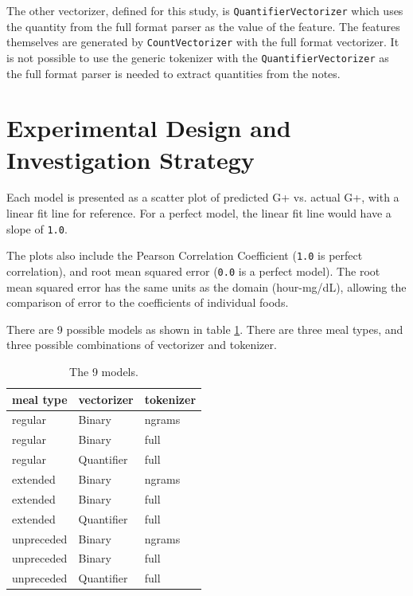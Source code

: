 \documentclass[conference]{IEEEtran}
\begin{document}
The other vectorizer, defined for this study, is \texttt{QuantifierVectorizer} which uses the quantity from the full format parser as the value of the feature. The features themselves are generated by \texttt{CountVectorizer} with the full format vectorizer. It is not possible to use the generic tokenizer with the \texttt{QuantifierVectorizer} as the full format parser is needed to extract quantities from the notes.

\section{Experimental Design and Investigation Strategy}

Each model is presented as a scatter plot of predicted G+ vs. actual G+, with a linear fit line for reference. For a perfect model, the linear fit line would have a slope of \texttt{1.0}.

The plots also include the Pearson Correlation Coefficient (\texttt{1.0} is perfect correlation), and root mean squared error (\texttt{0.0} is a perfect model). The root mean squared error has the same units as the domain (hour-mg/dL), allowing the comparison of error to the coefficients of individual foods.

There are 9 possible models as shown in table \ref{table:models}. There are three meal types, and three possible combinations of vectorizer and tokenizer.

\begin{table}
\centering
\begin{tabular}[tbp]{|l l l|}
    \hline
    meal type   & vectorizer & tokenizer \\
    \hline
    regular     & Binary     & ngrams \\
    regular     & Binary     & full \\
    regular     & Quantifier & full \\
    extended    & Binary     & ngrams \\
    extended    & Binary     & full \\
    extended    & Quantifier & full \\
    unpreceded & Binary     & ngrams \\
    unpreceded & Binary     & full \\
    unpreceded & Quantifier & full \\
    \hline
\end{tabular}
\caption{The 9 models. \label{table:models}}
\end{table}
\end{document}
